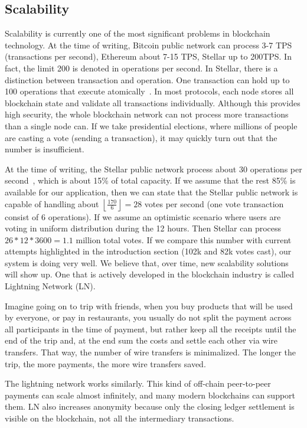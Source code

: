\documentclass[applsci,article,submit,moreauthors,pdftex]{Definitions/mdpi}
\newcommand{\floor}[1]{\left\lfloor #1 \right\rfloor}
\begin{document}
\subsection{Scalability}
Scalability is currently one of the most significant problems in blockchain technology. At the time of writing, Bitcoin public network can process 3-7 TPS (transactions per second), Ethereum about 7-15 TPS, Stellar up to 200TPS. In fact, the limit 200 is denoted in operations per second. In Stellar, there is a distinction between transaction and operation. One transaction can hold up to 100 operations 
that execute atomically~\cite{Protocol19:online}. 
In most protocols, each node stores all blockchain state and validate all transactions individually. Although this provides high security, the whole blockchain network can not process more transactions than a single node can. If we take presidential elections, where millions of people are casting a vote (sending a transaction), it may quickly turn out that the number is insufficient.

At the time of writing, the Stellar public network process about 30 operations per second~\cite{StellarN45:online}, which is about 15\% of total capacity. If we assume that the rest 85\% is available for our application, then we can state that the Stellar public network is capable of handling about $\floor{\frac{170}{6}} = 28$ votes per second (one vote transaction consist of 6 operations). If we assume an optimistic scenario where users are voting in uniform distribution during the 12 hours. Then Stellar can process $26 * 12 * 3600 = 1.1$ million total votes. If we compare this number with current attempts highlighted in the introduction section (102k and 82k votes cast), our system is doing very well. 
We believe that, over time, new scalability solutions will show up. One that is actively developed in the blockchain industry is called Lightning Network (LN).

Imagine going on to trip with friends, when you buy products that will be used by everyone, or pay in restaurants, you usually do not split the payment across all participants in the time of payment, but rather keep all the receipts until the end of the trip and, at the end sum the costs and settle each other via wire transfers. That way, the number of wire transfers is minimalized. The longer the trip, the more payments, the more wire transfers saved.

The lightning network works similarly. This kind of off-chain peer-to-peer payments can scale almost infinitely, and many modern blockchains can support them. LN also increases anonymity because only the closing ledger settlement is visible on the blockchain, not all the intermediary transactions. 
\end{document}
